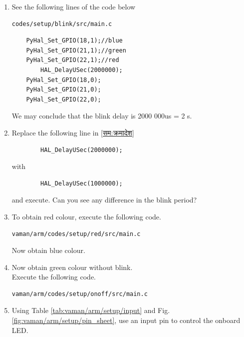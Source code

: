 \documentclass[journal,12pt,twocolumn]{IEEEtran}
\renewcommand\thesection{\arabic{section}}
\renewcommand\thesubsection{\thesection.\arabic{subsection}}
\begin{document}
\renewcommand{\theequation}{\theenumi}
\renewcommand{\thefigure}{\theenumi}
\begin{enumerate}[label=\thesubsection.\arabic*.,ref=\thesubsection.\theenumi]
\item See the following lines of the code below
\label{सम:क्रमादेश}
\begin{lstlisting}
codes/setup/blink/src/main.c
\end{lstlisting}
%
\begin{lstlisting}
    PyHal_Set_GPIO(18,1);//blue
    PyHal_Set_GPIO(21,1);//green
    PyHal_Set_GPIO(22,1);//red
        HAL_DelayUSec(2000000);
    PyHal_Set_GPIO(18,0);
    PyHal_Set_GPIO(21,0);
    PyHal_Set_GPIO(22,0);
\end{lstlisting}
%
We may conclude that the blink delay is 2000 000us = 2 s.
\item Replace the following line in \ref{सम:क्रमादेश}  
\label{सम:द्विआधार}
\begin{lstlisting}
        HAL_DelayUSec(2000000);
\end{lstlisting}
%
with
\begin{lstlisting}
        HAL_DelayUSec(1000000);
\end{lstlisting}
and execute.  Can you see any difference in the blink period?
\item To obtain red colour, execute the following code.
\begin{lstlisting}
vaman/arm/codes/setup/red/src/main.c
\end{lstlisting}
Now obtain blue colour.

\item Now obtain green colour without blink.
\\
\solution Execute the following code.
\begin{lstlisting}
vaman/arm/codes/setup/onoff/src/main.c
\end{lstlisting}
%
\item  Using Table  \ref{tab:vaman/arm/setup/input} and Fig.  \ref{fig:vaman/arm/setup/pin_sheet}, use an input pin to control the onboard LED.  


\end{enumerate}
\end{document}

